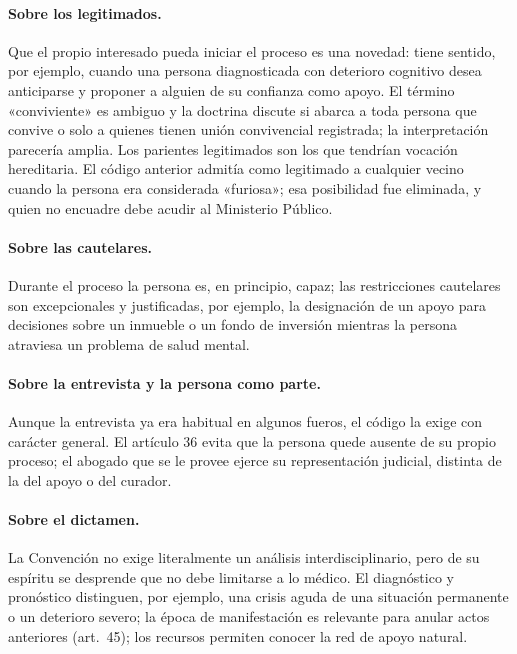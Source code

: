 \documentclass[12pt,oneside]{book}
\begin{document}

\paragraph{Sobre los legitimados.} Que el propio interesado pueda iniciar el proceso es una novedad: tiene sentido, por ejemplo, cuando una persona diagnosticada con deterioro cognitivo desea anticiparse y proponer a alguien de su confianza como apoyo. El término «conviviente» es ambiguo y la doctrina discute si abarca a toda persona que convive o solo a quienes tienen unión convivencial registrada; la interpretación parecería amplia. Los parientes legitimados son los que tendrían vocación hereditaria. El código anterior admitía como legitimado a cualquier vecino cuando la persona era considerada «furiosa»; esa posibilidad fue eliminada, y quien no encuadre debe acudir al Ministerio Público.

\paragraph{Sobre las cautelares.} Durante el proceso la persona es, en principio, capaz; las restricciones cautelares son excepcionales y justificadas, por ejemplo, la designación de un apoyo para decisiones sobre un inmueble o un fondo de inversión mientras la persona atraviesa un problema de salud mental.

\paragraph{Sobre la entrevista y la persona como parte.} Aunque la entrevista ya era habitual en algunos fueros, el código la exige con carácter general. El artículo 36 evita que la persona quede ausente de su propio proceso; el abogado que se le provee ejerce su representación judicial, distinta de la del apoyo o del curador.

\paragraph{Sobre el dictamen.} La Convención no exige literalmente un análisis interdisciplinario, pero de su espíritu se desprende que no debe limitarse a lo médico. El diagnóstico y pronóstico distinguen, por ejemplo, una crisis aguda de una situación permanente o un deterioro severo; la época de manifestación es relevante para anular actos anteriores (art.~45); los recursos permiten conocer la red de apoyo natural.
\end{document}
